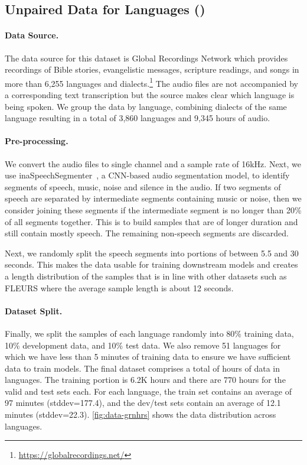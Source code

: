 \subsection{Unpaired Data for \numgrnlang{} Languages (\GRN)}
\label{sec:data-unpaired}

\paragraph{Data Source.}
The data source for this dataset is Global Recordings Network which provides recordings of Bible stories, evangelistic messages, scripture readings, and songs in more than 6,255 languages and dialects.\footnote{\url{https://globalrecordings.net/}}
The audio files are not accompanied by a corresponding text transcription but the source makes clear which language is being spoken.
We group the data by language, combining  dialects of the same language resulting in a total of 3,860 languages and 9,345 hours of audio.

\insertGRNHours

\paragraph{Pre-processing.}

We convert the audio files to single channel and a sample rate of 16kHz. 
Next, we use inaSpeechSegmenter~\citep{ddoukhanmirex2018}, a CNN-based audio segmentation model, to  identify segments of speech, music, noise and silence in the audio. 
If two segments of speech are separated by intermediate segments containing music or noise, then we consider joining these segments if the intermediate segment is no longer than 20\% of all segments together. 
This is to build samples that are of longer duration and still contain mostly speech.
The remaining non-speech segments are discarded.

Next, we randomly split the speech segments into portions of between 5.5 and 30 seconds. 
This makes the data usable for training downstream models and creates a length distribution of the samples that is in line with other datasets such as FLEURS where the average sample length is about 12 seconds.

\paragraph{Dataset Split.}
Finally, we split the samples of each language randomly into 80\% training data, 10\% development data, and 10\% test data. 
We also remove 51 languages for which we have less than 5 minutes of training data to ensure we have sufficient data to train models.
The final dataset comprises a total of \numgrnhrs{} hours of data in \numgrnlang{} languages.
The training portion is 6.2K hours and there are 770 hours for the valid and test sets each.
For each language, the train set contains an average of 97 minutes (stddev=177.4), and the dev/test sets contain an average of 12.1 minutes (stddev=22.3).
\autoref{fig:data-grnhrs} shows the data distribution across languages.



